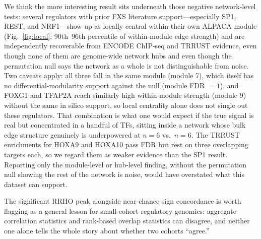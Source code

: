 \documentclass[journal]{IEEEtran}
\begin{document}
We think the more interesting result sits underneath those negative network-level tests: several regulators with prior FXS literature support---especially SP1, REST, and NRF1---show up as locally central within their own ALPACA module (Fig.~\ref{fig:local}; 90th--96th percentile of within-module edge strength) and are independently recoverable from ENCODE ChIP-seq and TRRUST evidence, even though none of them are genome-wide network hubs and even though the permutation null says the network as a whole is not distinguishable from noise. Two caveats apply: all three fall in the same module (module 7), which itself has no differential-modularity support against the null (module FDR $=1$), and FOXG1 and TFAP2A reach similarly high within-module strength (module 9) without the same in silico support, so local centrality alone does not single out these regulators. That combination is what one would expect if the true signal is real but concentrated in a handful of TFs, sitting inside a network whose bulk edge structure genuinely is underpowered at $n=6$ vs.\ $n=6$. The TRRUST enrichments for HOXA9 and HOXA10 pass FDR but rest on three overlapping targets each, so we regard them as weaker evidence than the SP1 result. Reporting only the module-level or hub-level finding, without the permutation null showing the rest of the network is noise, would have overstated what this dataset can support.

The significant RRHO peak alongside near-chance sign concordance is worth flagging as a general lesson for small-cohort regulatory genomics: aggregate correlation statistics and rank-based overlap statistics can disagree, and neither one alone tells the whole story about whether two cohorts ``agree.''
\end{document}
